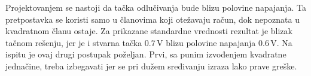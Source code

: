 Projektovanjem se nastoji da tačka odlučivanja bude blizu polovine napajanja. Ta pretpostavka se koristi samo u članovima koji otežavaju račun, dok nepoznata u kvadratnom članu ostaje. Za prikazane standardne vrednosti rezultat je blizak tačnom rešenju, jer je i stvarna tačka $0.7\,\mathrm V$ blizu polovine napajanja $0.6\,\mathrm V$. Na ispitu je ovaj drugi postupak poželjan. Prvi, sa punim izvođenjem kvadratne jednačine, treba izbegavati jer se pri dužem sređivanju izraza lako prave greške.
